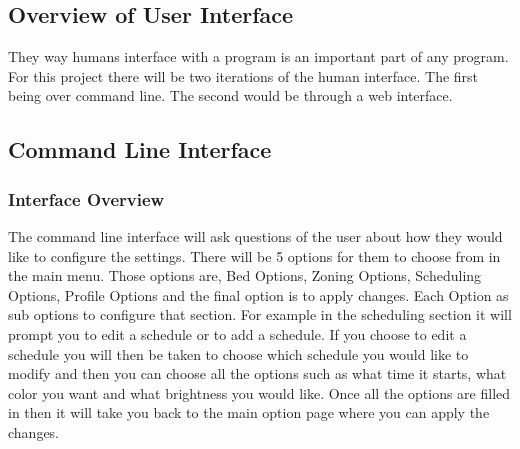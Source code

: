 \documentclass[onecolumn, draftclsnofoot,10pt, compsoc]{IEEEtran}
\begin{document}
			        \subsection{Overview of User Interface}
			        They way humans interface with a program is an important part of any program.
			        For this project there will be two iterations of the human interface. The
			        first being over command line. The second would be through a web interface.
			        \subsection{Command Line Interface}
			            \subsubsection{Interface Overview}
			            The command line interface will ask questions of the user about how they
			            would like to configure the settings. There will be 5 options for them to
			            choose from in the main menu. Those options are, Bed Options, Zoning Options,
			            Scheduling Options, Profile Options and the final option is to apply changes.
			            Each Option as sub options to configure that section. For example in the
			            scheduling section it will prompt you to edit a schedule or to add a schedule.
			            If you choose to edit a schedule you will then be taken to choose which
			            schedule you would like to modify and then you can choose all the options
			            such as what time it starts, what color you want and what brightness you would like.
			            Once all the options are filled in then it will take you back to the main
			            option page where you can apply the changes.
\end{document}
